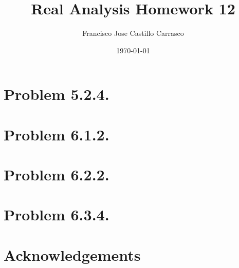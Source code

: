 




\title{Real Analysis Homework 12}
\author{Francisco Jose Castillo Carrasco}
\date{\today}
\maketitle




\section{Problem 5.2.4.}


\section{Problem 6.1.2.}


\section{Problem 6.2.2.}


\newpage
\section{Problem 6.3.4.}


\section*{Acknowledgements}






